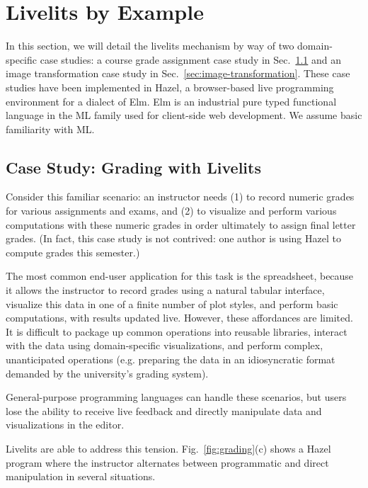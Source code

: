 \section{Livelits by Example}\label{sec:case-studies}


In this section, we will detail the livelits mechanism by way of
two domain-specific case studies:
a course grade assignment case study in Sec.~\ref{sec:live-grading}
and an image transformation case study in Sec.~\ref{sec:image-transformation}.
These case studies have been implemented
in Hazel, a browser-based live programming environment for a dialect of Elm.
Elm is an industrial pure typed functional language in the
ML family used for client-side web development.
We assume basic familiarity with ML.

\subsection{Case Study: Grading with Livelits}\label{sec:live-grading}
Consider this familiar scenario: an instructor needs
(1) to record numeric grades for various assignments and exams, and
(2) to visualize and perform various computations with these numeric grades
in order ultimately to assign final letter grades.
(In fact, this case study is not contrived: one author is using Hazel to compute grades this semester.)

The most common end-user application for this task is the spreadsheet, because
it allows the instructor to record grades using a natural tabular interface,
visualize this data in one of a finite number of plot styles,
and perform basic computations,
with results updated live.
However, these affordances are limited.
It is difficult to package up common operations
into reusable libraries, interact with the data using domain-specific visualizations,
and perform complex, unanticipated operations
(e.g. preparing the data in an idiosyncratic format demanded by the university's grading system).

General-purpose programming languages
can handle these scenarios, but users
lose the ability to receive live feedback and
directly manipulate data and visualizations in the editor.

Livelits are able to address this tension.
Fig.~\ref{fig:grading}(c) shows a Hazel program where
the instructor alternates between programmatic and direct manipulation in several situations.

